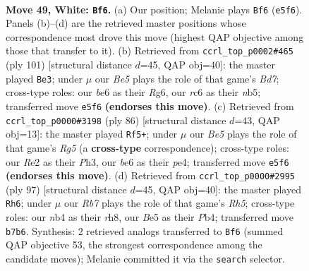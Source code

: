 \documentclass[11pt]{article}
\begin{document}
\clearpage

\begin{figure}[p]\centering
\begin{subfigure}{0.46\textwidth}\centering
\resizebox{\linewidth}{!}{%
\newchessgame
\chessboard[
  setfen={4k3/1R6/2r1b3/rp2B1p1/1n6/4P1PP/4RP1K/8 w - - 7 49},
  showmover=false,
  pgfstyle=straightmove, color=movearrow, markmove={e5-f6}
]}
\caption{}
\end{subfigure}\hfill
\begin{subfigure}{0.46\textwidth}\centering
\resizebox{\linewidth}{!}{%
\newchessgame
\chessboard[
  setfen={8/5k2/1R2p1rp/pN1pP3/3P2P1/7K/1P1b4/8 b - - 33 51},
  showmover=false,
  pgfstyle=straightmove, color=movearrow, markmove={d2-e3}
]}
\caption{}
\end{subfigure}
\\[4pt]
\begin{subfigure}{0.46\textwidth}\centering
\resizebox{\linewidth}{!}{%
\newchessgame
\chessboard[
  setfen={r7/3nbk2/1p6/p2P2R1/R1P1pP2/4P2P/5KP1/8 w - - 5 44},
  showmover=false,
  pgfstyle=straightmove, color=movearrow, markmove={g5-f5}
]}
\caption{}
\end{subfigure}\hfill
\begin{subfigure}{0.46\textwidth}\centering
\resizebox{\linewidth}{!}{%
\newchessgame
\chessboard[
  setfen={7R/7P/K3pk2/3r1p2/1p5r/1P6/P3R3/8 b - - 0 49},
  showmover=false,
  pgfstyle=straightmove, color=movearrow, markmove={h4-h6}
]}
\caption{}
\end{subfigure}
\caption{\textbf{Move 49, White: \texttt{Bf6}.} (a) Our position; Melanie plays \texttt{Bf6} (\texttt{e5f6}). Panels (b)--(d) are the retrieved master positions whose correspondence most drove this move (highest QAP objective among those that transfer to it). (b) Retrieved from \texttt{ccrl\_top\_p0002\#465} (ply 101) [structural distance $d$=45, QAP obj=40]: the master played \texttt{Be3}; under $\mu$ our \emph{Be5} plays the role of that game's \emph{Bd7}; cross-type roles: our \emph{b}e6 as their \emph{R}g6, our \emph{r}c6 as their \emph{n}b5; transferred move \texttt{e5f6} \textbf{(endorses this move)}. (c) Retrieved from \texttt{ccrl\_top\_p0000\#3198} (ply 86) [structural distance $d$=43, QAP obj=13]: the master played \texttt{Rf5+}; under $\mu$ our \emph{Be5} plays the role of that game's \emph{Rg5} (a \textbf{cross-type} correspondence); cross-type roles: our \emph{R}e2 as their \emph{P}h3, our \emph{b}e6 as their \emph{p}e4; transferred move \texttt{e5f6} \textbf{(endorses this move)}. (d) Retrieved from \texttt{ccrl\_top\_p0000\#2995} (ply 97) [structural distance $d$=45, QAP obj=40]: the master played \texttt{Rh6}; under $\mu$ our \emph{Rb7} plays the role of that game's \emph{Rh5}; cross-type roles: our \emph{n}b4 as their \emph{r}h8, our \emph{B}e5 as their \emph{P}b4; transferred move \texttt{b7b6}. Synthesis: 2 retrieved analogs transferred to \texttt{Bf6} (summed QAP objective 53, the strongest correspondence among the candidate moves); Melanie committed it via the \texttt{search} selector.}
\label{fig:thought-m96}
\end{figure}
\end{document}
